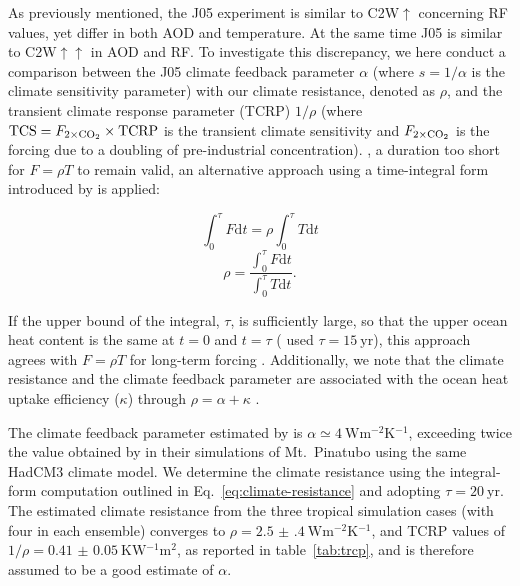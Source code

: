 \documentclass[draft]{agujournal2019}
\begin{document}
  As previously mentioned, the J05 experiment is similar to C2W\(\uparrow\) concerning
  RF values, yet differ in both AOD and temperature. At the same time J05 is similar to
  C2W\(\uparrow\uparrow\) in AOD and RF. To investigate this discrepancy, we here
  conduct a comparison between the J05 climate feedback parameter \(\alpha\) (where
  \(s=1/\alpha\) is the climate sensitivity parameter) with our climate resistance,
  denoted as \(\rho\), and the transient climate response parameter (TCRP) \(1/\rho\)
  (where \(\mathrm{TCS}=F_{2\times\ce{CO2}}\times \mathrm{TCRP}\) is the transient
  climate sensitivity and \(F_{2\times\ce{CO2}}\) is the forcing due to a doubling of
  pre-industrial  concentration). , a duration too short for \(F=\rho T\) to remain valid, an
  alternative approach using a time-integral form introduced by  is
  applied:

  \begin{equation}
    \int_0^{\tau}F \mathrm{d}t=\rho\int_{0}^{\tau}T \mathrm{d}t
    \label{eq:climate-resistance-orig}
  \end{equation}
  \begin{equation}
    \rho=\frac{\int_0^{\tau}F \mathrm{d}t}{\int_{0}^{\tau}T \mathrm{d}t}.
    \label{eq:climate-resistance}
  \end{equation}

  If the upper bound of the integral, \(\tau\), is sufficiently large, so that the upper
  ocean heat content is the same at \(t=0\) and \(t=\tau\) ( used
  \(\tau =\SI{15}{\mathrm{yr}}\)), this approach agrees with \(F=\rho T\) for long-term
  forcing \cite{gregory2016}. Additionally, we note that the climate resistance and the
  climate feedback parameter are associated with the ocean heat uptake efficiency
  (\(\kappa\)) through \(\rho =\alpha +\kappa\) \cite{gregory2016}.

  The climate feedback parameter estimated by  is \(\alpha \simeq
  \SI{4}{\watt\metre^{-2}\kelvin^{-1}}\), exceeding twice the value obtained by
   in their simulations of Mt.\ Pinatubo using the same HadCM3
  climate model. We determine the climate resistance using the integral-form computation
  outlined in Eq.~\ref{eq:climate-resistance} and adopting \(\tau
  =\SI{20}{\mathrm{yr}}\). The estimated climate resistance from the three tropical
  simulation cases (with four in each ensemble) converges to \(\rho
  =\SI{2.5(4)}{\watt\metre^{-2}\kelvin^{-1}}\), and TCRP values of
  \(1/\rho=\SI{0.41(5)}{\kelvin\watt^{-1}\metre^{2}}\), as reported in
  table~\ref{tab:trcp}, and is therefore assumed to be a good estimate of \(\alpha\).
\end{document}
